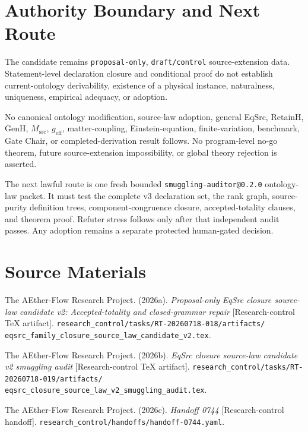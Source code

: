 \documentclass[11pt]{article}
\begin{document}
\section{Authority Boundary and Next Route}

The candidate remains \texttt{proposal-only}, \texttt{draft/control}
source-extension data. Statement-level declaration closure and conditional
proof do not establish current-ontology derivability, existence of a physical
instance, naturalness, uniqueness, empirical adequacy, or adoption.

No canonical ontology modification, source-law adoption, general EqSrc,
RetainH, GenH, \(M_{\mathrm{src}}\), \(g_{\mathrm{eff}}\), matter-coupling,
Einstein-equation, finite-variation, benchmark, Gate Chair, or
completed-derivation result follows. No program-level no-go theorem, future
source-extension impossibility, or global theory rejection is asserted.

The next lawful route is one fresh bounded
\texttt{smuggling-auditor@0.2.0} ontology-law packet. It must test the complete
v3 declaration set, the rank graph, source-purity definition trees,
component-congruence closure, accepted-totality clauses, and theorem proof.
Refuter stress follows only after that independent audit passes. Any adoption
remains a separate protected human-gated decision.

\section{Source Materials}

The AEther-Flow Research Project. (2026a). \emph{Proposal-only EqSrc closure
source-law candidate v2: Accepted-totality and closed-grammar repair}
[Research-control TeX artifact].
\texttt{research\_control/tasks/RT-20260718-018/artifacts/
eqsrc\_family\_closure\_source\_law\_candidate\_v2.tex}.

The AEther-Flow Research Project. (2026b). \emph{EqSrc closure source-law
candidate v2 smuggling audit} [Research-control TeX artifact].
\texttt{research\_control/tasks/RT-20260718-019/artifacts/
eqsrc\_closure\_source\_law\_v2\_smuggling\_audit.tex}.

The AEther-Flow Research Project. (2026c). \emph{Handoff 0744}
[Research-control handoff].
\texttt{research\_control/handoffs/handoff-0744.yaml}.
\end{document}
